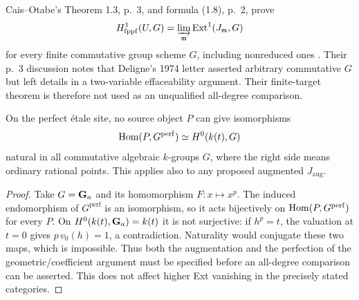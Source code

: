Cais--Otabe's Theorem 1.3, p.~3, and formula (1.8), p.~2,
prove
\[H^1_{\mathrm{fppf}}(U,G)=\varinjlim_{\mathfrak m}
\operatorname{Ext}^1(J_{\mathfrak m},G)\]
for every finite commutative group
scheme $G$, including nonreduced ones \cite{CaisOtabe2026}.
Their p.~3 discussion notes that Deligne's 1974 letter asserted
arbitrary commutative $G$ but left details in a two-variable
effaceability argument. Their finite-target theorem is therefore
not used as an unqualified all-degree comparison.

\begin{proposition}
On the perfect \'etale site, no source object $P$ can give
isomorphisms
\[
 \operatorname{Hom}(P,G^{\mathrm{perf}})\simeq H^0(k(t),G)
\]
natural in all commutative algebraic $k$-groups $G$, where the
right side means ordinary rational points. This applies also to
any proposed augmented $J_{\mathrm{aug}}$.
\end{proposition}
\begin{proof}
Take $G=\mathbf G_a$ and its homomorphism $F:x\mapsto x^p$.
The induced endomorphism of $G^{\mathrm{perf}}$ is an isomorphism,
so it acts bijectively on $\operatorname{Hom}(P,G^{\mathrm{perf}})$ for every
$P$. On $H^0(k(t),\mathbf G_a)=k(t)$ it is not surjective: if
$h^p=t$, the valuation at $t=0$ gives $p\,v_0(h)=1$, a
contradiction. Naturality would conjugate these two maps, which
is impossible. Thus both the augmentation and the perfection of
the geometric/coefficient argument must be specified before an
all-degree comparison can be asserted. This does not affect
higher Ext vanishing in the precisely stated categories.
\end{proof}
